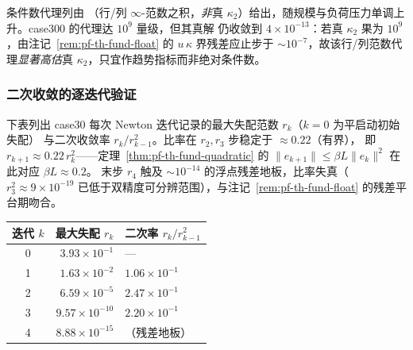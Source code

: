 条件数代理列由 （行/列 $\infty$-范数之积，\emph{非}真
$\kappa_2$）给出，随规模与负荷压力单调上升。case300 的代理达 $10^{9}$ 量级，但其真解
仍收敛到 $4\times10^{-13}$：若真 $\kappa_2$ 果为 $10^{9}$，由注记~\ref{rem:pf-th-fund-float}
的 $u\,\kappa$ 界残差应止步于 $\sim10^{-7}$，故该行/列范数代理\emph{显著高估}真
$\kappa_2$，只宜作趋势指标而非绝对条件数。

\subsubsection{二次收敛的逐迭代验证}
\begin{example}\label{ex:pf-th-fund-quadconv}
下表列出 case30 每次 Newton 迭代记录的最大失配范数 $r_k$（$k=0$ 为平启动初始失配）
与二次收敛率 $r_k/r_{k-1}^2$。比率在 $r_2,r_3$ 步稳定于 $\approx0.22$（有界），
即 $r_{k+1}\approx0.22\,r_k^2$——定理~\ref{thm:pf-th-fund-quadratic} 的
$\lVert e_{k+1}\rVert\le\beta L\lVert e_k\rVert^2$ 在此对应 $\beta L\approx0.2$。
末步 $r_4$ 触及 $\sim10^{-14}$ 的浮点残差地板，比率失真（$r_3^2\approx9\times10^{-19}$
已低于双精度可分辨范围），与注记~\ref{rem:pf-th-fund-float} 的残差平台期吻合。
\begin{center}\footnotesize
\begin{tabular}{@{}crl@{}}
\toprule
迭代 $k$ & 最大失配 $r_k$ & 二次率 $r_k/r_{k-1}^2$\\
\midrule
0 & $3.93\times10^{-1}$ & —\\
1 & $1.63\times10^{-2}$ & $1.06\times10^{-1}$\\
2 & $6.59\times10^{-5}$ & $2.47\times10^{-1}$\\
3 & $9.57\times10^{-10}$ & $2.20\times10^{-1}$\\
4 & $8.88\times10^{-15}$ & （残差地板）\\
\bottomrule
\end{tabular}
\end{center}
\end{example}

